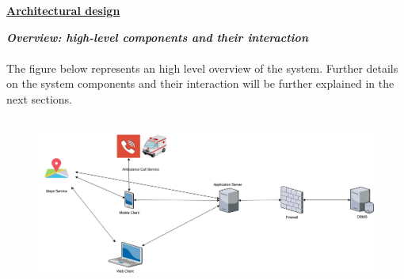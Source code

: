 	\underline{\textbf{Architectural design} }\\
	\begin{legal}
    	\item \textit{\textbf{Overview: high-level components and their interaction}}\\\\
The figure below represents an high level overview of the system. Further details
on the system components and their interaction will be further explained in the next sections.\\\\
		\begin{figure}[H]
		\includegraphics[width=\linewidth]{../images/design/OverviewDiagram.png}\\\\\\\\\\\\
		\end{figure}
		

\end{legal}
